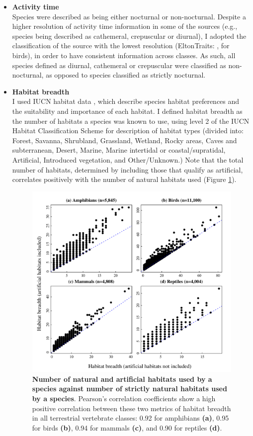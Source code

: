 \begin{itemize}
\item \textbf{Activity time}\\
Species were described as being either nocturnal or non-nocturnal. Despite a higher resolution of activity time information in some of the sources (e.g., species being described as cathemeral, crepuscular or diurnal), I adopted the classification of the source with the lowest resolution (EltonTraits: \citet{Wilman2014}, for birds), in order to have consistent information across classes. As such, all species defined as diurnal, cathemeral or crepuscular were classified as non-nocturnal, as opposed to species classified as strictly nocturnal.

\item \textbf{Habitat breadth}\\
I used IUCN habitat data \citep{IUCN2020}, which describe species habitat preferences and the suitability and importance of each habitat. I defined habitat breadth as the number of habitats a species was known to use, using level 2 of the IUCN Habitat Classification Scheme for description of habitat types (divided into: Forest, Savanna, Shrubland, Grassland, Wetland, Rocky areas, Caves and subterranean, Desert, Marine, Marine intertidal or coastal/supratidal, Artificial, Introduced vegetation, and Other/Unknown.) Note that the total number of habitats, determined by including those that qualify as artificial, correlates positively with the number of natural habitats used (Figure \ref{Fig_HB_main}).

\begin{figure}[h!]
\centering
\includegraphics[scale=0.7]{figures/Chapter1/Fig_HB_main}
\caption[]{\textbf{Number of natural and artificial habitats used by a species against number of strictly natural habitats used by a species}. Pearson's correlation coefficients show a high positive correlation between these two metrics of habitat breadth in all terrestrial vertebrate classes: 0.92 for amphibians \textbf{(a)}, 0.95 for birds \textbf{(b)}, 0.94 for mammals \textbf{(c)}, and 0.90 for reptiles \textbf{(d)}.}
\label{Fig_HB_main}
\end{figure}



\end{itemize}
